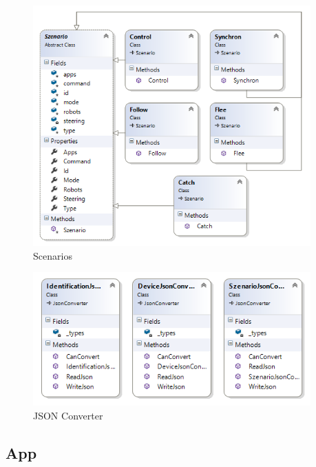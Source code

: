 \begin{figure}[h]
	\begin{center}
		\includegraphics[width=0.95\textwidth]{images/uml/szenarios.png}
	\end{center}
	\caption{Scenarios}
	\label{fig:szenarios_classdiagram}
\end{figure}

\begin{figure}[h]
	\begin{center}
		\includegraphics[width=0.95\textwidth]{images/uml/json_converter.png}
	\end{center}
	\caption{JSON Converter}
	\label{fig:converter_classdiagram}
\end{figure}

\subsection{App}

